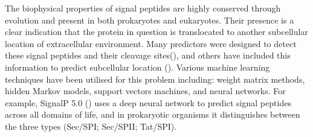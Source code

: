 The biophysical properties of signal peptides are highly conserved through evolution and present in both prokaryotes and eukaryotes.
Their presence is a clear indication that the protein in question is translocated to another subcellular location of extracellular environment.
Many predictors were designed to detect these signal peptides and their cleavage sites(\cite{armenteros2019}),
and others have included this information to predict subcellular location (\cite{jaramillo2014}).
Various machine learning techniques have been utilised for this problem including:
weight matrix methods,
hidden Markov models,
support vectors machines,
and neural networks.
For example,
SignalP 5.0 (\cite{armenteros2019}) uses a deep neural network to predict  signal peptides across all domains of life,
and in prokaryotic organisms it distinguishes between the three types (Sec/SPI; Sec/SPII; Tat/SPI).
